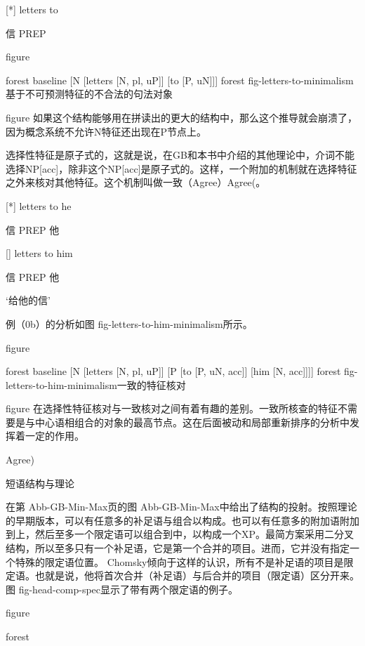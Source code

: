[*]
letters to

信 PREP



figure

forest
baseline
[N 
  [letters [N, pl, uP]]
  [to [P, uN]]]
forest
fig-letters-to-minimalism基于不可预测特征的不合法的句法对象

figure
如果这个结构能够用在拼读出的更大的结构中，那么这个推导就会崩溃了，因为概念系统不允许N特征还出现在P节点上。





选择性特征是原子式的，这就是说，在GB和本书中介绍的其他理论中，介词不能选择NP[acc]，除非这个NP[acc]是原子式的。这样，一个附加的机制就在选择特征之外来核对其他特征。这个机制叫做一致（Agree）Agree(。





[*]
letters to he

信 PREP 他


[]
letters to him

信 PREP 他

`给他的信'


例（0b）的分析如图 fig-letters-to-him-minimalism所示。

figure

forest
baseline
[N 
  [letters [N, pl, uP]]
  [P
    [to [P, uN, acc]]
    [him [N, acc]]]]
forest
fig-letters-to-him-minimalism一致的特征核对

figure
在选择性特征核对与一致核对之间有着有趣的差别。一致所核查的特征不需要是与中心语相组合的对象的最高节点。这在后面被动和局部重新排序的分析中发挥着一定的作用。




Agree)

短语结构与理论


在第 Abb-GB-Min-Max页的图 Abb-GB-Min-Max中给出了结构的投射。按照理论的早期版本，可以有任意多的补足语与组合以构成。也可以有任意多的附加语附加到上，然后至多一个限定语可以组合到中，以构成一个XP。最简方案采用二分叉结构，所以至多只有一个补足语，它是第一个合并的项目。进而，它并没有指定一个特殊的限定语位置。 Chomsky倾向于这样的认识，所有不是补足语的项目是限定语。也就是说，他将首次合并（补足语）与后合并的项目（限定语）区分开来。图 fig-head-comp-spec显示了带有两个限定语的例子。








figure

forest




